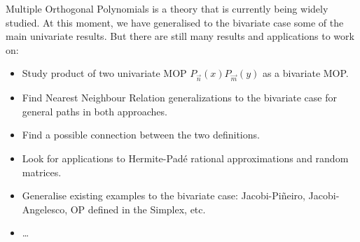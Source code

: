 \documentclass[portrait,final,a0paper,fontscale=0.38]{baposter}
\begin{document}
\begin{poster}
{
  Multiple Orthogonal Polynomials is a theory that is currently being widely studied. At this moment, we have generalised to the bivariate case some of the main univariate results. But there are still many results and applications to work on:
  \begin{itemize}
    \item Study product of two univariate MOP $P_{\vec n}(x)P_{\vec m}(y)$ as a bivariate MOP. 
    \item Find Nearest Neighbour Relation generalizations to the bivariate case for general paths in both approaches.
    \item Find a possible connection between the two definitions.
    \item Look for applications to Hermite-Padé rational approximations and random matrices.
    \item Generalise existing examples to the bivariate case: Jacobi-Piñeiro, Jacobi-Angelesco, OP defined in the Simplex, etc.
    \item \dots
  \end{itemize}


}



































%
%
\end{poster}
\end{document}
